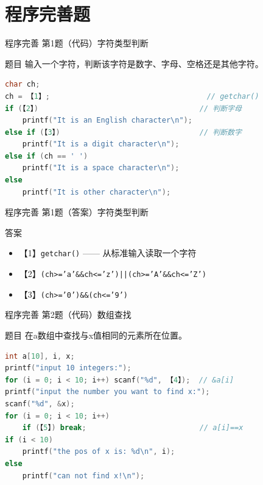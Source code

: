 \section{程序完善题}

\begin{frame}[fragile]{程序完善 第1题（代码）}{字符类型判断}
    \begin{exampleblock}{题目}
        输入一个字符，判断该字符是数字、字母、空格还是其他字符。
    \end{exampleblock}
    \begin{lstlisting}[language=C]
char ch;
ch = 【1】;                                    // getchar()
if (【2】)                                     // 判断字母
    printf("It is an English character\n");
else if (【3】)                                // 判断数字
    printf("It is a digit character\n");
else if (ch == ' ')
    printf("It is a space character\n");
else
    printf("It is other character\n");
\end{lstlisting}
\end{frame}

\begin{frame}{程序完善 第1题（答案）}{字符类型判断}
    \begin{alertblock}{答案}
        \footnotesize
        \begin{itemize}
            \setlength{\itemsep}{0pt}
            \item 【1】\texttt{getchar()} —— 从标准输入读取一个字符
            \item 【2】\texttt{(ch>='a'\&\&ch<='z')||(ch>='A'\&\&ch<='Z')}
            \item 【3】\texttt{(ch>='0')\&\&(ch<='9')}
        \end{itemize}
    \end{alertblock}
\end{frame}

\begin{frame}[fragile]{程序完善 第2题（代码）}{数组查找}
    \begin{exampleblock}{题目}
        在a数组中查找与x值相同的元素所在位置。
    \end{exampleblock}
    \begin{lstlisting}[language=C]
int a[10], i, x;
printf("input 10 integers:");
for (i = 0; i < 10; i++) scanf("%d", 【4】);  // &a[i]
printf("input the number you want to find x:");
scanf("%d", &x);
for (i = 0; i < 10; i++)
    if (【5】) break;                          // a[i]==x
if (i < 10)
    printf("the pos of x is: %d\n", i);
else
    printf("can not find x!\n");
\end{lstlisting}
\end{frame}

